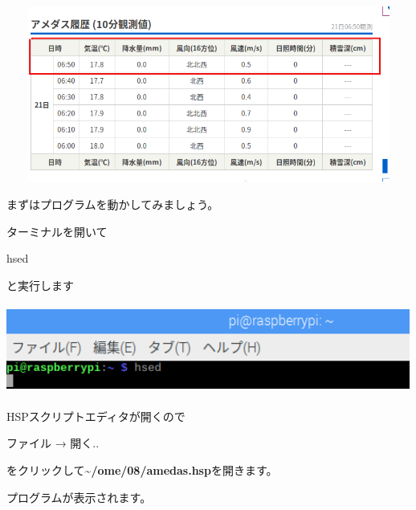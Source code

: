 \documentclass[a4paper,12pt,dvipdfmx]{jarticle}
\begin{document}
\begin{center}
\includegraphics[width=17.006cm,height=5.777cm]{textbook-img029-1.png}

\end{center}

\bigskip

\clearpage
まずはプログラムを動かしてみましょう。

ターミナルを開いて

hsed

と実行します



\begin{center}
\includegraphics[width=13.28cm,height=2.933cm]{textbook-img013.png}

\end{center}

\bigskip


\bigskip


\bigskip

HSPスクリプトエディタが開くので

ファイル → 開く.. 

をクリックして\textbf{\~{}/ome/08/amedas.hsp}を開きます。

プログラムが表示されます。
\end{document}
